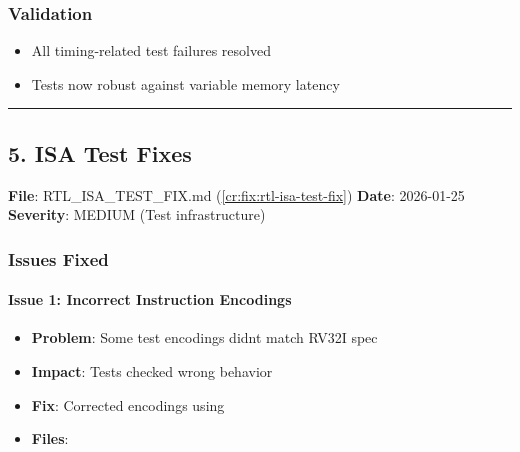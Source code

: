 \subsubsection{Validation}\label{cr:fix:fixes-index:validation-1}

\begin{record}

\begin{itemize}
\tightlist
\item
  \ok{} All timing-related test failures resolved
\item
  \ok{} Tests now robust against variable memory latency
\end{itemize}

\begin{center}\rule{0.5\linewidth}{0.5pt}\end{center}

\end{record}

\subsection{5. ISA Test Fixes}\label{cr:fix:fixes-index:5-isa-test-fixes}

\begin{record}

\textbf{File}:
RTL\_\allowbreak{}ISA\_\allowbreak{}TEST\_\allowbreak{}FIX.md (\cref{cr:fix:rtl-isa-test-fix})
\textbf{Date}: 2026-01-25 \textbf{Severity}: \partialmark{} MEDIUM (Test
infrastructure)

\end{record}

\subsubsection{Issues Fixed}\label{cr:fix:fixes-index:issues-fixed-3}

\paragraph{Issue 1: Incorrect Instruction Encodings}\label{cr:fix:fixes-index:issue-1-incorrect-instruction-encodings}

\begin{record}

\begin{itemize}
\tightlist
\item
  \textbf{Problem}: Some test encodings didn\textquotesingle t match
  RV32I spec
\item
  \textbf{Impact}: Tests checked wrong behavior
\item
  \textbf{Fix}: Corrected encodings using 
\item
  \textbf{Files}: 
\end{itemize}

\end{record}


